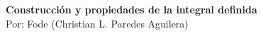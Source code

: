 \begin{center}
\LARGE\textbf{Construcción y propiedades de la integral definida}\\
\normalsize
\vspace{.3cm}
Por: Fode (Christian L. Paredes Aguilera)
\end{center}
\vspace{.5cm}

\begin{flushleft}
\end{flushleft}
\vspace{.5cm}
